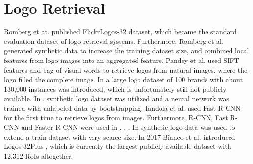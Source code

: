 \section{Logo Retrieval}
Romberg et at. \cite{Romberg:2011:SLR:1991996.1992021} published FlickrLogos-32 dataset, which became the standard evaluation dataset of logo retrieval systems. Furthermore, Romberg et al. \cite{conf/mir/RombergL13} generated synthetic data to increase the training dataset size, and combined local features from logo images into an aggregated feature. Pandey et al. \cite{DBLP:conf/icip/PandeyDJPB14} used SIFT features and bag-of visual words to retrieve logos from natural images, where the logo filled the complete image. In \cite{DBLP:journals/corr/HoiWLWWXW15} a large logo dataset of 100 brands with about 130,000 instances was introduced, which is unfortunately still not publicly available. In \cite{Eggert:2015:BSD:2733373.2806407}, synthetic logo dataset was utilized and a neural network was trained with unlabeled data by bootstrapping. Iandola et al. \cite{DBLP:journals/corr/IandolaSGK15} used Fast R-CNN for the first time to retrieve logos from images. Furthermore, R-CNN, Fast R-CNN and Faster R-CNN were used in \cite{Bao:2016:RCL:3007669.3007728}, \cite{DBLP:journals/corr/OliveiraFPR16}, \cite{DBLP:journals/spl/QiSWX17}. In \cite{DBLP:journals/corr/SuZG16} synthetic logo data was used to extend a train dataset with very scarce size. In 2017 Bianco et al. introduced Logos-32Plus \cite{bianco2017deep}, which is currently the largest publicly available dataset with 12,312 RoIs altogether.